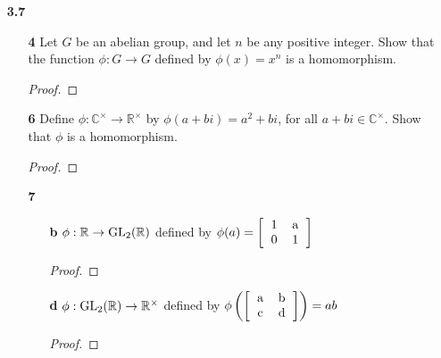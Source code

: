 \documentclass[paper=usletter, fontsize=12pt]{article}
\begin{document}
\begin{itemize}
\begin{itemize}
        \end{itemize}

        \item[\textbf{3.7}]
        \begin{enumerate}

            \item[\textbf{4}] Let $G$ be an abelian group, and let $n$ be any
            positive integer. Show that the function $\phi: G \rightarrow G$
            defined by $\phi(x)=x^n$ is a homomorphism.
            \begin{proof}
            \end{proof}

            \item[\textbf{6}] Define $\phi:
            \mathbb{C}^{\times}\rightarrow\mathbb{R}^{\times}$ by
            $\phi(a+bi)=a^2+bi$, for all $a+bi\in \mathbb{C}^{\times}$. Show
            that $\phi$ is a homomorphism.
            \begin{proof}
            \end{proof}

            \item[\textbf{7}]
            \begin{enumerate}

                \item[\textbf{b}] $\phi: \mathbb{R} \rightarrow \text{GL}_2(\mathbb{R})$ defined by $\phi(a)=\left[\begin{tabular}{cc}
                            1 & a \\
                            0 & 1
                \end{tabular}\right]$
                \begin{proof}
                \end{proof}

                \item[\textbf{d}] $\phi: \text{GL}_2(\mathbb{R}) \rightarrow \mathbb{R}^{\times}$ defined by $\phi\left(\left[\begin{tabular}{cc}
                            a & b \\
                            c & d
                \end{tabular}\right]\right)=ab$
                \begin{proof}
                \end{proof}

            \end{enumerate}


\end{enumerate}
\end{itemize}
\end{document}

